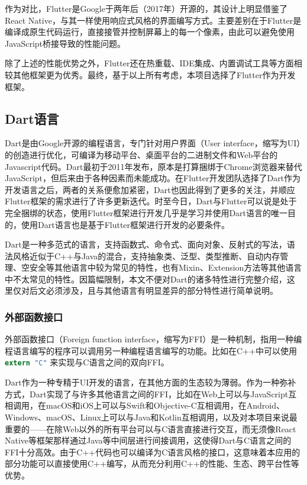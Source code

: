 作为对比，Flutter是Google于两年后（2017年）开源的，其设计上明显借鉴了React Native，与其一样使用响应式风格的界面编写方式。主要差别在于Flutter是编译成原生代码运行，直接接管并控制屏幕上的每一个像素，由此可以避免使用JavaScript桥接导致的性能问题。

除了上述的性能优势之外，Flutter还在热重载、IDE集成、内置调试工具等方面相较其他框架更为优秀。最终，基于以上所有考虑，本项目选择了Flutter作为开发框架。

\subsection{Dart语言}\label{subsec:dart}

Dart是由Google开源的编程语言，专门针对用户界面（User interface，缩写为UI）的创造进行优化，可编译为移动平台、桌面平台的二进制文件和Web平台的Javascript代码\cite{DartProgrammingLanguage}。Dart最初于2011年发布，原本是打算捆绑于Chrome浏览器来替代JavaScript，但后来由于各种因素而未能成功。在Flutter开发团队选择了Dart作为开发语言之后，两者的关系便愈加紧密，Dart也因此得到了更多的关注，并顺应Flutter框架的需求进行了许多更新迭代。时至今日，Dart与Flutter可以说是处于完全捆绑的状态，使用Flutter框架进行开发几乎是学习并使用Dart语言的唯一目的，使用Dart语言也是基于Flutter框架进行开发的必要条件。

Dart是一种多范式的语言，支持函数式、命令式、面向对象、反射式的写法，语法风格近似于C++与Java的混合，支持抽象类、泛型、类型推断、自动内存管理、空安全等其他语言中较为常见的特性，也有Mixin、Extension方法等其他语言中不太常见的特性。因篇幅限制，本文不便对Dart的诸多特性进行完整介绍，这里仅对后文必须涉及，且与其他语言有明显差异的部分特性进行简单说明。

\subsubsection{外部函数接口}\label{subsubsec:ffi}

外部函数接口（Foreign function interface，缩写为FFI）是一种机制，指用一种编程语言编写的程序可以调用另一种编程语言编写的功能。比如在C++中可以使用 \lstinline[language=C]{extern "C"} 来实现与C语言之间的双向FFI。

Dart作为一种专精于UI开发的语言，在其他方面的生态较为薄弱。作为一种弥补方式，Dart实现了与许多其他语言之间的FFI，比如在Web上可以与JavaScript互相调用，在macOS和iOS上可以与Swift和Objective-C互相调用，在Android、Windows、macOS、Linux上可以与Java和Kotlin互相调用，以及对本项目来说最重要的——在除Web以外的所有平台可以与C语言直接进行交互，而无须像React Native等框架那样通过Java等中间层进行间接调用，这使得Dart与C语言之间的FFI十分高效。由于C++代码也可以编译为C语言风格的接口，这意味着本应用的部分功能可以直接使用C++编写，从而充分利用C++的性能、生态、跨平台性等优势。

